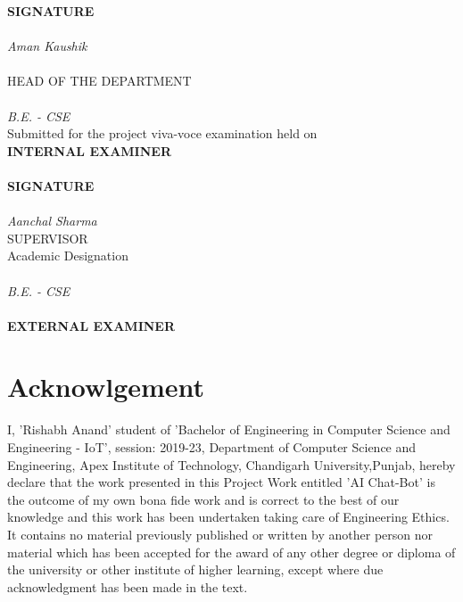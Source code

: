 \documentclass[14pt]{extarticle}
\begin{document}
\begin{multicols*}{2}
\begin{center}
\vspace*{5em}
\textbf{SIGNATURE}\\
\phantom{ }\\
\emph{Aman Kaushik}\\
\phantom{ }\\
HEAD OF THE DEPARTMENT\\
\phantom{ }\\
\emph{B.E. - CSE}\\
\vspace{3em}
Submitted for the project viva-voce examination held on\\
\vspace{5em}
\textbf{INTERNAL EXAMINER}\\
\vspace{10em}
\phantom{ }\\
\vspace{6em}
\textbf{SIGNATURE}\\
\phantom{ }\\
\emph{Aanchal Sharma}\\
SUPERVISOR\\
Academic Designation\\
\phantom{ }\\
\emph{B.E. - CSE}\\
\vspace{9em}
\phantom{}\\
\textbf{EXTERNAL EXAMINER}\\
\end{center}
\end{multicols*}

\newpage
\section*{Acknowlgement}

I, 'Rishabh Anand' student of 'Bachelor of Engineering in Computer Science and Engineering - IoT',
session: 2019-23, Department of Computer Science and Engineering, Apex Institute of Technology, Chandigarh University,Punjab,
hereby declare that the work presented in this Project Work entitled 'AI Chat-Bot'
is the outcome of my own bona fide work and is correct to the best of our knowledge
and this work has been undertaken taking care of Engineering Ethics. \\

It contains no material previously published or written by another person
nor material which has been accepted for the award of any other degree or diploma of the university or other institute of higher learning,
except where due acknowledgment has been made in the text.
\end{document}
